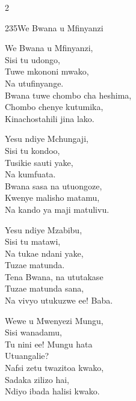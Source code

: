 \begin{multicols}{2}
\begin{hymn}{235}{We Bwana u Mfinyanzi}{}
\begin{stanza}
We Bwana u Mfinyanzi,\\
Sisi tu udongo,\\
Tuwe mkononi mwako,\\
Na utufinyange.\\
Bwana tuwe chombo cha heshima,\\
Chombo chenye kutumika,\\
Kinachostahili jina lako.
\end{stanza}
\begin{stanza}
Yesu ndiye Mchungaji,\\
Sisi tu kondoo,\\
Tusikie sauti yake,\\
Na kumfuata.\\
Bwana sasa na utuongoze,\\
Kwenye malisho matamu,\\
Na kando ya maji matulivu.
\end{stanza}
\begin{stanza}
Yesu ndiye Mzabibu,\\
Sisi tu matawi,\\
Na tukae ndani yake,\\
Tuzae matunda.\\
Tena Bwana, na ututakase\\
Tuzae matunda sana,\\
Na vivyo utukuzwe ee! Baba.
\end{stanza}
\begin{stanza}
Wewe u Mwenyezi Mungu,\\
Sisi wanadamu,\\
Tu nini ee! Mungu hata\\
Utuangalie?\\
Nafsi zetu twazitoa kwako,\\
Sadaka zilizo hai,\\
Ndiyo ibada halisi kwako.
\end{stanza}
\end{hymn}


\end{multicols}
